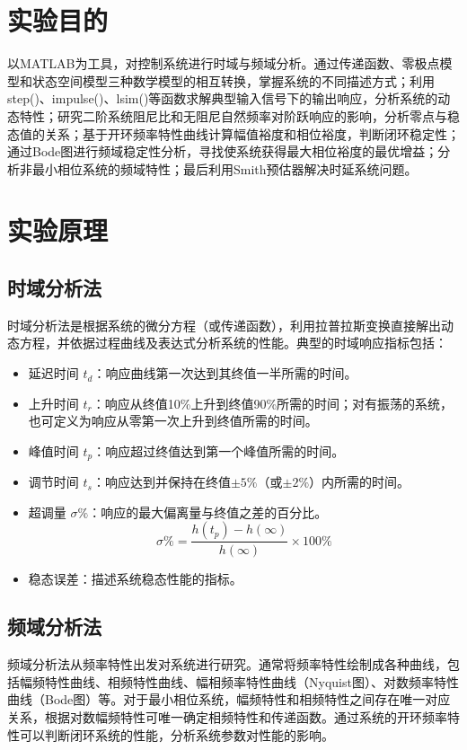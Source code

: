 \documentclass{../common/SCNU_Experimental_Report}
\begin{document}
\maketitle

\section{实验目的}
以MATLAB为工具，对控制系统进行时域与频域分析。通过传递函数、零极点模型和状态空间模型三种数学模型的相互转换，掌握系统的不同描述方式；利用step()、impulse()、lsim()等函数求解典型输入信号下的输出响应，分析系统的动态特性；研究二阶系统阻尼比和无阻尼自然频率对阶跃响应的影响，分析零点与稳态值的关系；基于开环频率特性曲线计算幅值裕度和相位裕度，判断闭环稳定性；通过Bode图进行频域稳定性分析，寻找使系统获得最大相位裕度的最优增益；分析非最小相位系统的频域特性；最后利用Smith预估器解决时延系统问题。

\section{实验原理}
\subsection{时域分析法}
时域分析法是根据系统的微分方程（或传递函数），利用拉普拉斯变换直接解出动态方程，并依据过程曲线及表达式分析系统的性能。典型的时域响应指标包括：

\begin{itemize}
    \item 延迟时间 $t_d$：响应曲线第一次达到其终值一半所需的时间。
    \item 上升时间 $t_r$：响应从终值10\%上升到终值90\%所需的时间；对有振荡的系统，也可定义为响应从零第一次上升到终值所需的时间。
    \item 峰值时间 $t_p$：响应超过终值达到第一个峰值所需的时间。
    \item 调节时间 $t_s$：响应达到并保持在终值$\pm5\%$（或$\pm2\%$）内所需的时间。
    \item 超调量 $\sigma\%$：响应的最大偏离量与终值之差的百分比。
    \begin{equation}
    \sigma\% = \frac{h(t_p) - h(\infty)}{h(\infty)} \times 100\%
    \end{equation}
    \item 稳态误差：描述系统稳态性能的指标。
\end{itemize}

\subsection{频域分析法}
频域分析法从频率特性出发对系统进行研究。通常将频率特性绘制成各种曲线，包括幅频特性曲线、相频特性曲线、幅相频率特性曲线（Nyquist图）、对数频率特性曲线（Bode图）等。对于最小相位系统，幅频特性和相频特性之间存在唯一对应关系，根据对数幅频特性可唯一确定相频特性和传递函数。通过系统的开环频率特性可以判断闭环系统的性能，分析系统参数对性能的影响。
\end{document}
